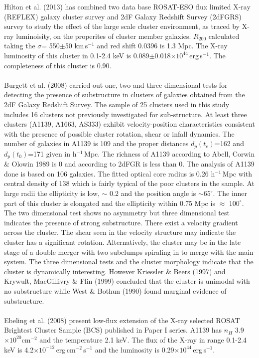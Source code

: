 Hilton et al. (2013) has combined two data base ROSAT-ESO flux limited X-ray (REFLEX) galaxy cluster survey and 2dF Galaxy Redshift Survey (2dFGRS) survey to study the effect of the large scale cluster environment, as traced by X-ray luminoisity, on the properites of cluster member galaxies. $R_{200}$ calculated taking the $\sigma$= 550$\pm$50 km\,s$^{-1}$ and red shift 0.0396 is 1.3 Mpc. The X-ray luminosity of this cluster in 0.1-2.4 keV is 0.089$\pm$0.018$\times 10^{44}$\,erg\,s$^{-1}$. The completeness of this cluster is 0.90.\\\\
Burgett et al. (2008) carried out one, two and three dimensional tests for detecting the presence of substructure in clusters of galaxies obtained from the 2dF Galaxy Redshift Survey. The sample of 25 clusters used in this study includes 16 clusters not previously investigated for sub-structure. At least three clusters (A1139, A1663, AS333) exhibit velocity-position characteristics consistent with the presence of possible cluster rotation, shear or infall dynamics. The number of galaxies in A1139 is 109 and the proper distances $d_{p}(t_e)$=162 and $d_p(t_0)$=171 given in h$^{-1}$\,Mpc. The richness of A1139 according to Abell, Corwin \& Olowin 1989 is 0 and according to 2dFGR is less than 0. The analysis of A1139 done is based on 106 galaxies. The fitted optical core radius is 0.26 h$^{-1}$\,Mpc with central density of 138 which is fairly typical of the poor clusters in the sample. At large radii the ellipticity is low, $\sim$ 0.2 and the position angle is $\sim 65^{\circ}$. The inner part of this cluster is elongated and the ellipticity within 0.75 Mpc is $\approx$ $100^\circ$. The two dimensional test shows no asymmetry but three dimensional test indicates the presence of strong substructure. There exist a velocity gradient across the cluster. The shear seen in the velocity structure may indicate the cluster has a significant rotation. Alternatively, the cluster may be in the late stage of a double merger with two subclumps spiraling in to merge with the main system. The three dimensional tests and the cluster morphology indicate that the cluster is dynamically interesting. However Kriessler \& Beers (1997) and Krywult, MacGillivry \& Flin (1999) concluded that the cluster is unimodal with no substructure while West \& Bothun (1990) found marginal evidence of substructure.\\\\
Ebeling et al. (2008) present low-flux extension of the X-ray selected ROSAT Brightest Cluster Sample (BCS) published in  Paper I series. A1139 has $n_H$ 3.9 $\times 10^{20}$cm$^{-2}$ and the temperature 2.1 keV. The flux of the X-ray in range 0.1-2.4 keV is 4.2$\times 10^{-12}$\,erg\,cm$^{-2}$\,s$^{-1}$ and the luminosity is 0.29$\times 10^{44}$\,erg\,s$^{-1}$.\\\\
